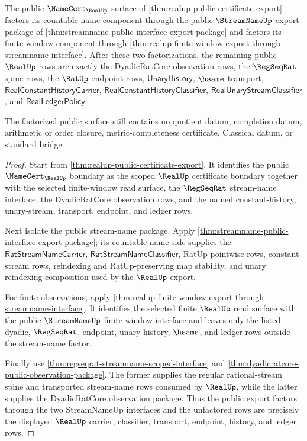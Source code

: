 \begin{theorem}
\label{thm:realup-public-export-through-streamname-public-interface}
The public $\NameCert_{\RealUp}$ surface of
\autoref{thm:realup-public-certificate-export} factors its countable-name
component through the public $\StreamNameUp$ export package of
\autoref{thm:streamname-public-interface-export-package} and factors its
finite-window component through
\autoref{thm:realup-finite-window-export-through-streamname-interface}. After
these two factorizations, the remaining public $\RealUp$ rows are exactly the
DyadicRatCore observation rows, the $\RegSeqRat$ spine rows, the $\RatUp$
endpoint rows, $\mathsf{UnaryHistory}$, $\hsame$ transport,
$\mathsf{RealConstantHistoryCarrier}$,
$\mathsf{RealConstantHistoryClassifier}$,
$\mathsf{RealUnaryStreamClassifier}$, and $\mathsf{RealLedgerPolicy}$.

The factorized public surface still contains no quotient datum, completion
datum, arithmetic or order closure, metric-completeness certificate, Classical
datum, or standard bridge.
\end{theorem}
\begin{proof}
Start from \autoref{thm:realup-public-certificate-export}. It identifies the
public $\NameCert_{\RealUp}$ boundary as the scoped $\RealUp$ certificate
boundary together with the selected finite-window read surface, the
$\RegSeqRat$ stream-name interface, the DyadicRatCore observation rows, and the
named constant-history, unary-stream, transport, endpoint, and ledger rows.

Next isolate the public stream-name package. Apply
\autoref{thm:streamname-public-interface-export-package}; its countable-name
side supplies the $\mathsf{RatStreamNameCarrier}$,
$\mathsf{RatStreamNameClassifier}$, RatUp pointwise rows, constant stream rows,
reindexing and RatUp-preserving map stability, and unary reindexing composition
used by the $\RealUp$ export.

For finite observations, apply
\autoref{thm:realup-finite-window-export-through-streamname-interface}. It
identifies the selected finite $\RealUp$ read surface with the public
$\StreamNameUp$ finite-window interface and leaves only the listed dyadic,
$\RegSeqRat$, endpoint, unary-history, $\hsame$, and ledger rows outside the
stream-name factor.

Finally use \autoref{thm:regseqrat-streamname-scoped-interface} and
\autoref{thm:dyadicratcore-public-observation-package}. The former supplies the
regular rational-stream spine and transported stream-name rows consumed by
$\RealUp$, while the latter supplies the DyadicRatCore observation package.
Thus the public export factors through the two StreamNameUp interfaces and the
unfactored rows are precisely the displayed $\RealUp$ carrier, classifier,
transport, endpoint, history, and ledger rows.
\end{proof}
